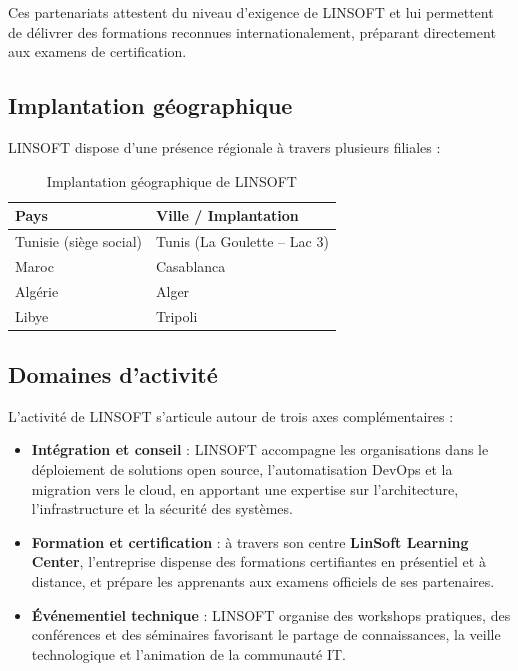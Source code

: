 \documentclass[12pt,a4paper,oneside]{report}
\begin{document}
Ces partenariats attestent du niveau d'exigence de LINSOFT et lui permettent de délivrer des
formations reconnues internationalement, préparant directement aux examens de certification.

\subsection{Implantation géographique}
LINSOFT dispose d'une présence régionale à travers plusieurs filiales :

\begin{table}[H]\centering
\renewcommand{\arraystretch}{1.3}
\begin{tabular}{|l|l|}
\hline
\rowcolor{gray!15}\textbf{Pays} & \textbf{Ville / Implantation} \\ \hline
Tunisie (siège social) & Tunis (La Goulette -- Lac 3) \\ \hline
Maroc & Casablanca \\ \hline
Algérie & Alger \\ \hline
Libye & Tripoli \\ \hline
\end{tabular}
\caption{Implantation géographique de LINSOFT}\label{tab:implantation}
\end{table}

\subsection{Domaines d'activité}
L'activité de LINSOFT s'articule autour de trois axes complémentaires :

\begin{itemize}[leftmargin=1.2cm]
  \item \textbf{Intégration et conseil} : LINSOFT accompagne les organisations dans le
  déploiement de solutions open source, l'automatisation DevOps et la migration vers le cloud,
  en apportant une expertise sur l'architecture, l'infrastructure et la sécurité des systèmes.
  \item \textbf{Formation et certification} : à travers son centre \textbf{LinSoft Learning
  Center}, l'entreprise dispense des formations certifiantes en présentiel et à distance, et
  prépare les apprenants aux examens officiels de ses partenaires.
  \item \textbf{Événementiel technique} : LINSOFT organise des workshops pratiques, des
  conférences et des séminaires favorisant le partage de connaissances, la veille
  technologique et l'animation de la communauté IT.
\end{itemize}
\end{document}
